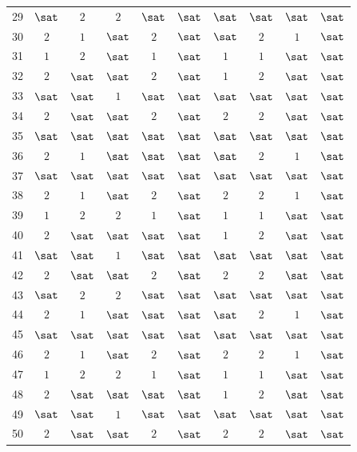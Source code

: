 {\begin{tabular}{r*{9}{c}}
29 & $\sat$ & $2$ & $2$ & $\sat$ & $\sat$ & $\sat$ & $\sat$ & $\sat$ & $\sat$\\
30 & $2$ & $1$ & $\sat$ & $2$ & $\sat$ & $\sat$ & $2$ & $1$ & $\sat$\\
31 & $1$ & $2$ & $\sat$ & $1$ & $\sat$ & $1$ & $1$ & $\sat$ & $\sat$\\
32 & $2$ & $\sat$ & $\sat$ & $2$ & $\sat$ & $1$ & $2$ & $\sat$ & $\sat$\\
33 & $\sat$ & $\sat$ & $1$ & $\sat$ & $\sat$ & $\sat$ & $\sat$ & $\sat$ & $\sat$\\
34 & $2$ & $\sat$ & $\sat$ & $2$ & $\sat$ & $2$ & $2$ & $\sat$ & $\sat$\\
35 & $\sat$ & $\sat$ & $\sat$ & $\sat$ & $\sat$ & $\sat$ & $\sat$ & $\sat$ & $\sat$\\
\midrule
\rowcolor{pale}
36 & $2$ & $1$ & $\sat$ & $\sat$ & $\sat$ & $\sat$ & $2$ & $1$ & $\sat$\\
\rowcolor{pale}
37 & $\sat$ & $\sat$ & $\sat$ & $\sat$ & $\sat$ & $\sat$ & $\sat$ & $\sat$ & $\sat$\\
\rowcolor{pale}
38 & $2$ & $1$ & $\sat$ & $2$ & $\sat$ & $2$ & $2$ & $1$ & $\sat$\\
\rowcolor{pale}
39 & $1$ & $2$ & $2$ & $1$ & $\sat$ & $1$ & $1$ & $\sat$ & $\sat$\\
\rowcolor{pale}
40 & $2$ & $\sat$ & $\sat$ & $\sat$ & $\sat$ & $1$ & $2$ & $\sat$ & $\sat$\\
\rowcolor{pale}
41 & $\sat$ & $\sat$ & $1$ & $\sat$ & $\sat$ & $\sat$ & $\sat$ & $\sat$ & $\sat$\\
\rowcolor{pale}
42 & $2$ & $\sat$ & $\sat$ & $2$ & $\sat$ & $2$ & $2$ & $\sat$ & $\sat$\\
\midrule
43 & $\sat$ & $2$ & $2$ & $\sat$ & $\sat$ & $\sat$ & $\sat$ & $\sat$ & $\sat$\\
\midrule
\rowcolor{pale}
44 & $2$ & $1$ & $\sat$ & $\sat$ & $\sat$ & $\sat$ & $2$ & $1$ & $\sat$\\
\rowcolor{pale}
45 & $\sat$ & $\sat$ & $\sat$ & $\sat$ & $\sat$ & $\sat$ & $\sat$ & $\sat$ & $\sat$\\
\rowcolor{pale}
46 & $2$ & $1$ & $\sat$ & $2$ & $\sat$ & $2$ & $2$ & $1$ & $\sat$\\
\rowcolor{pale}
47 & $1$ & $2$ & $2$ & $1$ & $\sat$ & $1$ & $1$ & $\sat$ & $\sat$\\
\rowcolor{pale}
48 & $2$ & $\sat$ & $\sat$ & $\sat$ & $\sat$ & $1$ & $2$ & $\sat$ & $\sat$\\
\rowcolor{pale}
49 & $\sat$ & $\sat$ & $1$ & $\sat$ & $\sat$ & $\sat$ & $\sat$ & $\sat$ & $\sat$\\
\rowcolor{pale}
50 & $2$ & $\sat$ & $\sat$ & $2$ & $\sat$ & $2$ & $2$ & $\sat$ & $\sat$\\
\bottomrule
\end{tabular}}

